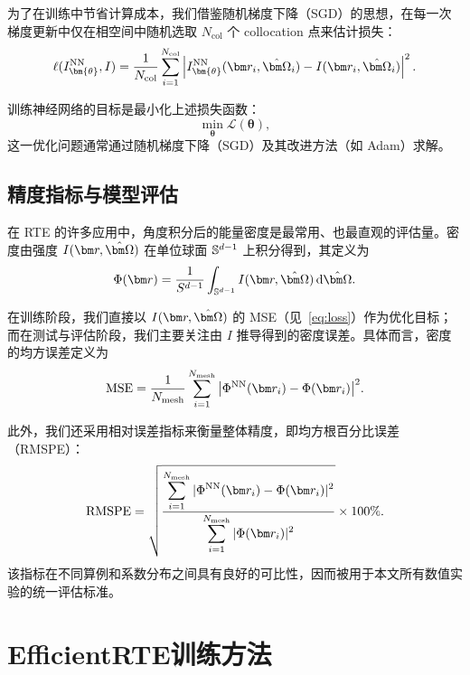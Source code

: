 为了在训练中节省计算成本，我们借鉴随机梯度下降（SGD）的思想，在每一次梯度更新中仅在相空间中随机选取 $N_\text{col}$ 个 collocation 点来估计损失：
\begin{equation}\label{eq:collocation_points}
    \ell(I^\text{NN}_{\bm{\theta}}, I)= \frac{1}{N_\text{col}}\sum_{i=1}^{N_{\text{col}}} \left| I^{\text{NN}}_{\bm{\theta}}(\br_i,\bOmega_i) - I(\br_i, \bOmega_i) \right|^2.
\end{equation}

训练神经网络的目标是最小化上述损失函数：
\begin{equation}
    \min_{\bm{\theta}} \mathcal{L}(\bm{\theta}),
\end{equation}
这一优化问题通常通过随机梯度下降（SGD）及其改进方法（如 Adam）求解。
\subsection{精度指标与模型评估}

在 RTE 的许多应用中，角度积分后的能量密度是最常用、也最直观的评估量。密度由强度 $I(\br,\bOmega)$ 在单位球面 $\mathbb{S}^{d-1}$ 上积分得到，其定义为
\begin{equation}\label{eq:density}
    \Phi(\br) = \frac{1}{S^{d-1}}\int_{\sS^{d-1}} I(\br, \bOmega) \,\mathrm{d}{\bOmega}.
\end{equation}

在训练阶段，我们直接以 $I(\br,\bOmega)$ 的 MSE（见~\eqref{eq:loss}）作为优化目标；而在测试与评估阶段，我们主要关注由 $I$ 推导得到的密度误差。具体而言，密度的均方误差定义为
\begin{equation}
    \text{MSE} = \frac{1}{N_{\text{mesh}}}\sum_{i=1}^{N_{\text{mesh}}} \big| \Phi^{\text{NN}}(\br_i) - \Phi(\br_i) \big|^2.
\end{equation}

此外，我们还采用相对误差指标来衡量整体精度，即均方根百分比误差（RMSPE）：
\begin{equation}
    \text{RMSPE} = \sqrt{\frac{\displaystyle\sum^{N_{\text{mesh}}}_{i=1} |\Phi^{\text{NN}}(\br_i) - \Phi(\br_i)|^2}{\displaystyle\sum^{N_{\text{mesh}}}_{i=1}|\Phi(\br_i)|^2}}\times 100\%.
\end{equation}
该指标在不同算例和系数分布之间具有良好的可比性，因而被用于本文所有数值实验的统一评估标准。

\section{EfficientRTE训练方法}

